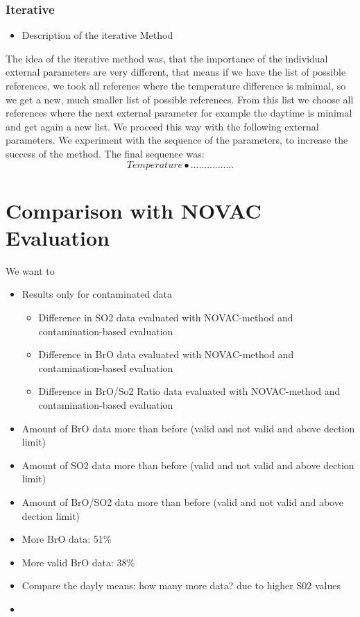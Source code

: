 \documentclass  [
  paper    = a4,
  BCOR     = 10mm,
  twoside,
  fontsize = 12pt,
  fleqn,
  toc      = bibnumbered,
  toc      = listofnumbered,
  numbers  = noendperiod,
  headings = normal,
  listof   = leveldown,
  version  = 3.03
]                                       {scrreprt}
\begin{document}
	\subsection{Iterative}
	\begin{itemize}
		\item Description of the iterative Method
	\end{itemize}
	The idea of the iterative method was, that the importance of the individual external parameters are very different, that means if we have the list of possible references, we took all referenes where the temperature difference is minimal, so we get a new, much smaller list of possible referenecs. From this list we choose all references where the next external parameter for example the daytime is minimal and get again a new list. We proceed this way with the following external parameters. We experiment with the sequence of the parameters, to increase the success of the method. The final sequence was:
	\begin{equation*}
	Temperature \bullet ................
	\end{equation*} 
	
	\chapter{Comparison with NOVAC Evaluation}
	We want to 
	\begin{itemize}
		\item Results only for contaminated data
		\begin{itemize}
			\item Difference in SO2 data evaluated with NOVAC-method and contamination-based evaluation
			\item Difference in BrO data evaluated with NOVAC-method and contamination-based evaluation
			\item Difference in BrO/So2 Ratio data evaluated with NOVAC-method and contamination-based evaluation
		\end{itemize}
		\item Amount of BrO data more than before (valid and not valid and above dection limit)
		\item Amount of SO2 data more than before (valid and not valid and above dection limit)
		\item Amount of BrO/SO2 data more than before (valid and not valid and above dection limit)
		\item More BrO data: 51\%
		\item  More valid BrO data: 38\%
		\item Compare the dayly means: how many more data? due to higher S02 values
		\item 
	\end{itemize}
\end{document}
